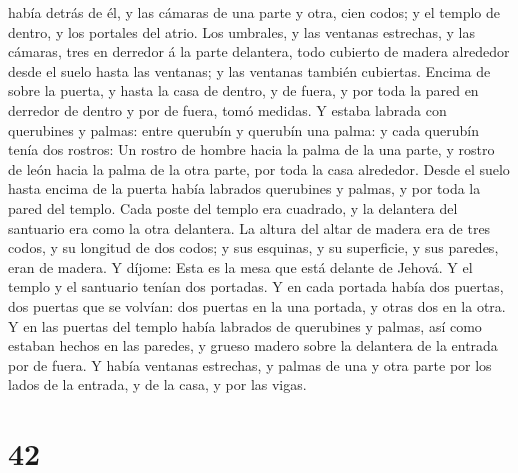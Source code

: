 había detrás de él, y las cámaras de una parte y otra, cien codos; y el
templo de dentro, y los portales del atrio.  Los
umbrales, y las ventanas estrechas, y las cámaras, tres en derredor á la
parte delantera, todo cubierto de madera alrededor desde el suelo hasta
las ventanas; y las ventanas también cubiertas.  Encima
de sobre la puerta, y hasta la casa de dentro, y de fuera, y por toda la
pared en derredor de dentro y por de fuera, tomó medidas.
 Y estaba labrada con querubines y palmas: entre querubín
y querubín una palma: y cada querubín tenía dos rostros: 
Un rostro de hombre hacia la palma de la una parte, y rostro de león
hacia la palma de la otra parte, por toda la casa alrededor.
 Desde el suelo hasta encima de la puerta había labrados
querubines y palmas, y por toda la pared del templo. 
Cada poste del templo era cuadrado, y la delantera del santuario era
como la otra delantera.  La altura del altar de madera
era de tres codos, y su longitud de dos codos; y sus esquinas, y su
superficie, y sus paredes, eran de madera. Y díjome: Esta es la mesa que
está delante de Jehová.  Y el templo y el santuario
tenían dos portadas.  Y en cada portada había dos
puertas, dos puertas que se volvían: dos puertas en la una portada, y
otras dos en la otra.  Y en las puertas del templo había
labrados de querubines y palmas, así como estaban hechos en las paredes,
y grueso madero sobre la delantera de la entrada por de fuera.
 Y había ventanas estrechas, y palmas de una y otra parte
por los lados de la entrada, y de la casa, y por las vigas.

\hypertarget{section-41}{%
\section{42}\label{section-41}}

